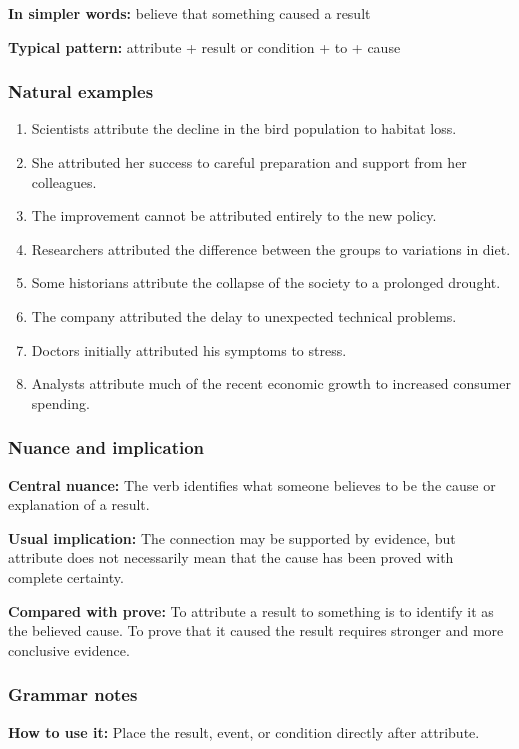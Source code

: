 \documentclass[11pt]{article}
\begin{document}
\textbf{In simpler words:} believe that something caused a result

\textbf{Typical pattern:} attribute + result or condition + to + cause

\subsubsection{Natural examples}
\begin{enumerate}
  \item Scientists attribute the decline in the bird population to habitat loss.
  \item She attributed her success to careful preparation and support from her colleagues.
  \item The improvement cannot be attributed entirely to the new policy.
  \item Researchers attributed the difference between the groups to variations in diet.
  \item Some historians attribute the collapse of the society to a prolonged drought.
  \item The company attributed the delay to unexpected technical problems.
  \item Doctors initially attributed his symptoms to stress.
  \item Analysts attribute much of the recent economic growth to increased consumer spending.
\end{enumerate}

\subsubsection{Nuance and implication}
\textbf{Central nuance:} The verb identifies what someone believes to be the cause or explanation of a result.

\textbf{Usual implication:} The connection may be supported by evidence, but attribute does not necessarily mean that the cause has been proved with complete certainty.

\textbf{Compared with prove:} To attribute a result to something is to identify it as the believed cause. To prove that it caused the result requires stronger and more conclusive evidence.

\subsubsection{Grammar notes}
\textbf{How to use it:} Place the result, event, or condition directly after attribute.
\end{document}
